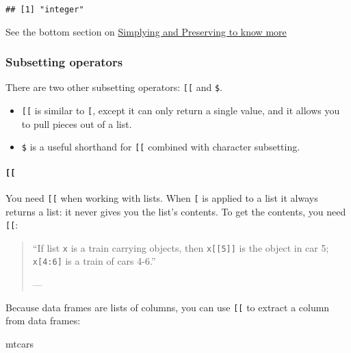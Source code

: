 \documentclass[
]{book}
\newenvironment{Shaded}{\begin{snugshade}}{\end{snugshade}}
\newcommand{\NormalTok}[1]{#1}
\providecommand{\tightlist}{%
  \setlength{\itemsep}{0pt}\setlength{\parskip}{0pt}}
\begin{document}
\begin{verbatim}
## [1] "integer"
\end{verbatim}

See the bottom section on \protect\hyperlink{simplify-preserve}{Simplying and Preserving to know more}

\hypertarget{subsetting-operators}{%
\subsubsection{Subsetting operators}\label{subsetting-operators}}

There are two other subsetting operators: \texttt{{[}{[}} and \texttt{\$}.

\begin{itemize}
\tightlist
\item
  \texttt{{[}{[}} is similar to \texttt{{[}}, except it can only return a single value, and it allows you to pull pieces out of a list.
\item
  \texttt{\$} is a useful shorthand for \texttt{{[}{[}} combined with character subsetting.
\end{itemize}

\hypertarget{section}{%
\paragraph{\texorpdfstring{\texttt{{[}{[}}}{{[}{[}}}\label{section}}

You need \texttt{{[}{[}} when working with lists. When \texttt{{[}} is applied to a list it always returns a list: it never gives you the list's contents. To get the contents, you need \texttt{{[}{[}}:

\begin{quote}
``If list \texttt{x} is a train carrying objects, then \texttt{x{[}{[}5{]}{]}} is
the object in car 5; \texttt{x{[}4:6{]}} is a train of cars 4-6.''

--- \citet{RLangTip}
\end{quote}

Because data frames are lists of columns, you can use \texttt{{[}{[}} to extract a column from data frames:

\begin{Shaded}
\begin{Highlighting}[]
\NormalTok{mtcars}
\end{Highlighting}
\end{Shaded}
\end{document}
